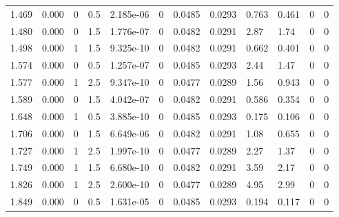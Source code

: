 \documentclass[preview]{standalone}
\begin{document}
{{\begin{tabular}{L{1.2cm}C{1.2cm} C{0.3cm}C{0.5cm} C{1.4cm}C{1.4cm} C{1.4cm}C{1.4cm} C{1.6cm}C{1.6cm} C{1.6cm}C{1.6cm}}
  1.469  &  0.000  & 0     & 0.5 &  2.185e-06  & 0  &  0.0485&   0.0293& 0.763 & 0.461   &  0 & 0  \\ 
  1.480  &  0.000  & 0     & 1.5 &  1.776e-07  & 0  &  0.0482&   0.0291& 2.87 & 1.74   &  0 & 0  \\ 
  1.498  &  0.000  & 1     & 1.5 &  9.325e-10  & 0  &  0.0482&   0.0291& 0.662 & 0.401   &  0 & 0  \\ 
  1.574  &  0.000  & 0     & 0.5 &  1.257e-07  & 0  &  0.0485&   0.0293& 2.44 & 1.47   &  0 & 0  \\ 
  1.577  &  0.000  & 1     & 2.5 &  9.347e-10  & 0  &  0.0477&   0.0289& 1.56 & 0.943   &  0 & 0  \\ 
  1.589  &  0.000  & 0     & 1.5 &  4.042e-07  & 0  &  0.0482&   0.0291& 0.586 & 0.354   &  0 & 0  \\ 
  1.648  &  0.000  & 1     & 0.5 &  3.885e-10  & 0  &  0.0485&   0.0293& 0.175 & 0.106   &  0 & 0  \\ 
  1.706  &  0.000  & 0     & 1.5 &  6.649e-06  & 0  &  0.0482&   0.0291& 1.08 & 0.655   &  0 & 0  \\ 
  1.727  &  0.000  & 1     & 2.5 &  1.997e-10  & 0  &  0.0477&   0.0289& 2.27 & 1.37   &  0 & 0  \\ 
  1.749  &  0.000  & 1     & 1.5 &  6.680e-10  & 0  &  0.0482&   0.0291& 3.59 & 2.17   &  0 & 0  \\ 
  1.826  &  0.000  & 1     & 2.5 &  2.600e-10  & 0  &  0.0477&   0.0289& 4.95 & 2.99   &  0 & 0  \\ 
  1.849  &  0.000  & 0     & 0.5 &  1.631e-05  & 0  &  0.0485&   0.0293& 0.194 & 0.117   &  0 & 0  \\ 
\hline 
\end{tabular} 

}}
\end{document}
